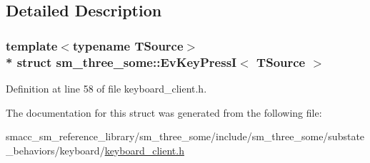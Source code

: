 \subsection{Detailed Description}
\subsubsection*{template$<$typename T\+Source$>$\\*
struct sm\+\_\+three\+\_\+some\+::\+Ev\+Key\+Press\+I$<$ T\+Source $>$}



Definition at line 58 of file keyboard\+\_\+client.\+h.



The documentation for this struct was generated from the following file\+:\begin{DoxyCompactItemize}
\item 
smacc\+\_\+sm\+\_\+reference\+\_\+library/sm\+\_\+three\+\_\+some/include/sm\+\_\+three\+\_\+some/substate\+\_\+behaviors/keyboard/\hyperlink{keyboard__client_8h}{keyboard\+\_\+client.\+h}\end{DoxyCompactItemize}
